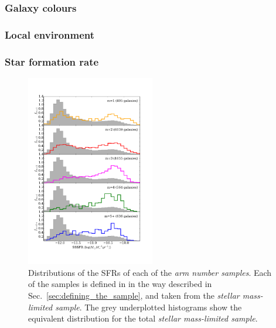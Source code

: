 \documentclass[useAMS,usenatbib]{mn2e}
\begin{document}
\subsubsection{Galaxy colours}

\subsubsection{Local environment}


\subsubsection{Star formation rate}
\label{sec:sfr}

\begin{figure}
		\centering

        \includegraphics[width=0.5\textwidth]{Images/Results/sfr_histograms.pdf}

        \caption{Distributions of the SFRs of each of the \emph{arm number samples}. Each of the samples is defined in in the way described in Sec.~\ref{sec:defining_the_sample}, and taken from the \emph{stellar mass-limited sample}. The grey underplotted histograms show the equivalent distribution for the total \textit{stellar mass-limited sample}.}

        \label{fig:sfr_histograms}

\end{figure}
\end{document}
